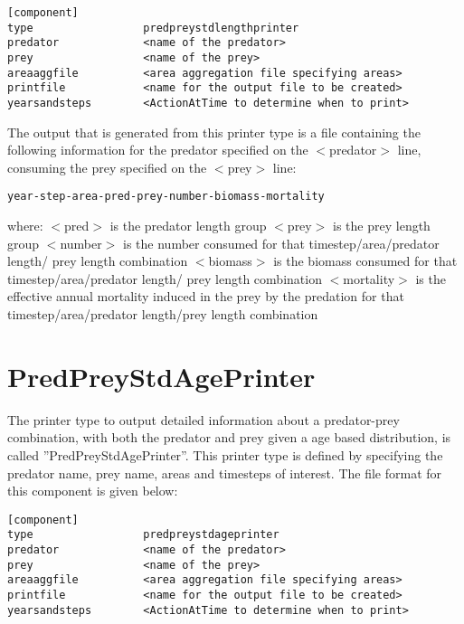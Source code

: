 \documentclass [a4paper, 10pt]{book}
\begin{document}
{\small\begin{verbatim}
[component]
type                 predpreystdlengthprinter
predator             <name of the predator>
prey                 <name of the prey>
areaaggfile          <area aggregation file specifying areas>
printfile            <name for the output file to be created>
yearsandsteps        <ActionAtTime to determine when to print>
\end{verbatim}}

The output that is generated from this printer type is a file containing the following information for the predator specified on the $<$predator$>$ line, consuming the prey specified on the $<$prey$>$ line:

{\small\begin{verbatim}
year-step-area-pred-prey-number-biomass-mortality
\end{verbatim}}

where:\newline
$<$pred$>$ is the predator length group\newline
$<$prey$>$ is the prey length group\newline
$<$number$>$ is the number consumed for that timestep/area/predator length/ prey length combination\newline
$<$biomass$>$ is the biomass consumed for that timestep/area/predator length/ prey length combination\newline
$<$mortality$>$ is the effective annual mortality induced in the prey by the predation for that timestep/area/predator length/prey length combination

\section{PredPreyStdAgePrinter}\label{sec:predpreystdageprinter}
The printer type to output detailed information about a predator-prey combination, with both the predator and prey given a age based distribution, is called ''PredPreyStdAgePrinter''.  This printer type is defined by specifying the predator name, prey name, areas and timesteps of interest.  The file format for this component is given below:

{\small\begin{verbatim}
[component]
type                 predpreystdageprinter
predator             <name of the predator>
prey                 <name of the prey>
areaaggfile          <area aggregation file specifying areas>
printfile            <name for the output file to be created>
yearsandsteps        <ActionAtTime to determine when to print>
\end{verbatim}}
\end{document}
